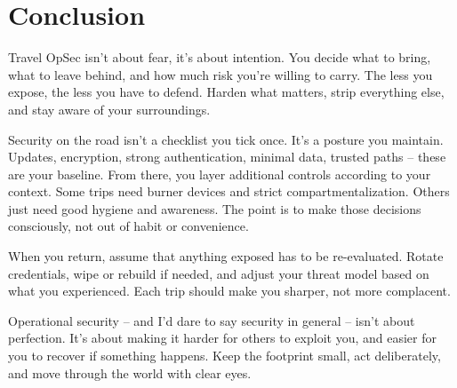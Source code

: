 \chapter{Conclusion}

Travel OpSec isn't about fear, it's about intention. You
decide what to bring, what to leave behind, and how much
risk you're willing to carry. The less you expose, the
less you have to defend. Harden what matters, strip
everything else, and stay aware of your surroundings.

Security on the road isn't a checklist you tick once. It's
a posture you maintain. Updates, encryption, strong
authentication, minimal data, trusted paths -- these are
your baseline. From there, you layer additional controls
according to your context. Some trips need burner devices
and strict compartmentalization. Others just need good
hygiene and awareness. The point is to make those
decisions consciously, not out of habit or convenience.

When you return, assume that anything exposed has to be
re-evaluated. Rotate credentials, wipe or rebuild if
needed, and adjust your threat model based on what you
experienced. Each trip should make you sharper, not more
complacent.

Operational security -- and I'd dare to say security in
general -- isn't about perfection. It's about making it
harder for others to exploit you, and easier for you to
recover if something happens. Keep the footprint small,
act deliberately, and move through the world with clear
eyes.
